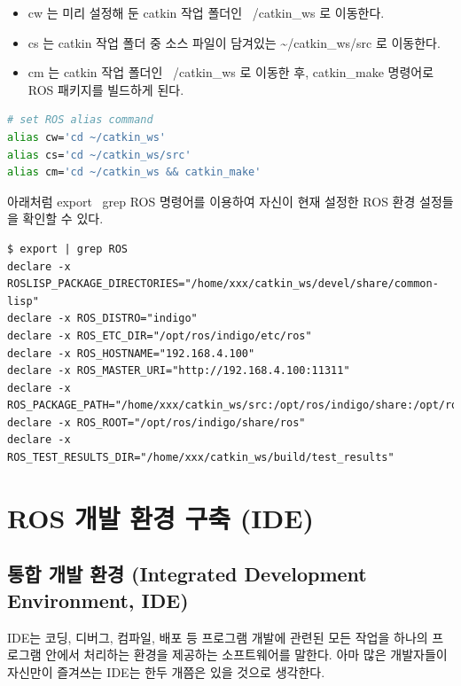 \begin{itemize}[leftmargin=*]
\item cw 는 미리 설정해 둔 catkin 작업 폴더인 ~/catkin\_ws 로 이동한다. 
\item cs 는 catkin 작업 폴더 중 소스 파일이 담겨있는 \textasciitilde/catkin\_ws/src 로 이동한다. 
\item cm 는 catkin 작업 폴더인 ~/catkin\_ws 로 이동한 후, catkin\_make 명령어로 ROS 패키지를 빌드하게 된다.
\end{itemize}

\vspace{\baselineskip}
\begin{lstlisting}[language=bash]
# set ROS alias command
alias cw='cd ~/catkin_ws'
alias cs='cd ~/catkin_ws/src'
alias cm='cd ~/catkin_ws && catkin_make'
\end{lstlisting}

\begin{exercise}[ROS 환경 설정 확인 방법]
아래처럼 export \textbar~grep ROS 명령어를 이용하여 자신이 현재 설정한 ROS 환경 설정들을 확인할 수 있다.
\begin{lstlisting}[language=ROS, backgroundcolor=\color{ocre!10}, numbers=none]
$ export | grep ROS
declare -x ROSLISP_PACKAGE_DIRECTORIES="/home/xxx/catkin_ws/devel/share/common-lisp"
declare -x ROS_DISTRO="indigo"
declare -x ROS_ETC_DIR="/opt/ros/indigo/etc/ros"
declare -x ROS_HOSTNAME="192.168.4.100"
declare -x ROS_MASTER_URI="http://192.168.4.100:11311"
declare -x ROS_PACKAGE_PATH="/home/xxx/catkin_ws/src:/opt/ros/indigo/share:/opt/ros/indigo/stacks"
declare -x ROS_ROOT="/opt/ros/indigo/share/ros"
declare -x ROS_TEST_RESULTS_DIR="/home/xxx/catkin_ws/build/test_results"
\end{lstlisting}
\end{exercise}

\section{ROS 개발 환경 구축 (IDE)}

\subsection{통합 개발 환경 (Integrated Development Environment, IDE)}

IDE는 코딩, 디버그, 컴파일, 배포 등 프로그램 개발에 관련된 모든 작업을 하나의 프로그램 안에서 처리하는 환경을 제공하는 소프트웨어를 말한다. 아마 많은 개발자들이 자신만이 즐겨쓰는 IDE는 한두 개쯤은 있을 것으로 생각한다. 

